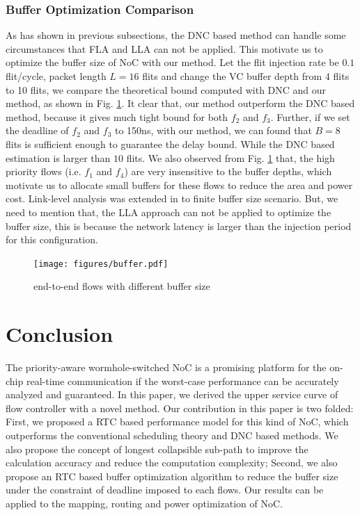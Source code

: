 \documentclass[10pt,journal]{IEEEtran}
\begin{document}
\subsubsection{Buffer Optimization Comparison}
As has shown in previous subsections, the DNC based method \cite{Qian489900} can handle some circumstances that FLA and LLA can not be applied. This motivate us to optimize the buffer size of NoC with our method. Let the flit injection rate be $0.1$ flit/cycle, packet length $L=16$ flits and change the VC buffer depth from 4 flits to 10 flits, we compare the theoretical bound computed with DNC and our method, as shown in Fig. \ref{buffer}. It clear that, our method outperform the DNC based method, because it gives much tight bound for both $f_2$ and $f_3$. Further, if we set the deadline of $f_2$ and $f_3$ to 150ns, with our method, we can found that $B=8$ flits is sufficient enough to guarantee the delay bound. While the DNC based estimation is larger than $10$ flits. We also observed from Fig. \ref{buffer} that, the high priority flows (i.e. $f_1$ and $f_4$) are very insensitive to the buffer depths, which motivate us to allocate small buffers for these flows to reduce the area and power cost. Link-level analysis was extended in \cite{189} to finite buffer size scenario. But, we need to mention that, the LLA approach can not be applied to optimize the buffer size, this is because the network latency is larger than the injection period for this configuration.
\begin{figure}
  \centering
  \texttt{[image: figures/buffer.pdf]}\\
  \caption{end-to-end flows with different buffer size}\label{buffer}
\end{figure}

\section{Conclusion}\label{conclusion}
The priority-aware wormhole-switched NoC is a promising platform for the on-chip real-time communication if the worst-case performance can be accurately analyzed and guaranteed. In this paper, we derived the upper service curve of flow controller with a novel method. Our contribution in this paper is two folded: First, we proposed a RTC based performance model for this kind of NoC, which outperforms the conventional scheduling theory and DNC based methods. We also propose the concept of longest collapsible sub-path to improve the calculation accuracy and reduce the computation complexity; Second, we also propose an RTC based buffer optimization algorithm to reduce the buffer size under the constraint of deadline imposed to each flows. Our results can be applied to the mapping, routing and power optimization of NoC.
\end{document}
